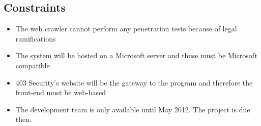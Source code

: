 \subsection{Constraints}
\begin{itemize}
    \item The web crawler cannot perform any penetration tests because of legal ramifications
    \item The system will be hosted on a Microsoft server and thuse must be Microsoft compatible
    \item 403 Security's website will be the gateway to the program and therefore the front-end must be web-based
    \item The development team is only available until May 2012.  The project is due then.
\end{itemize}
